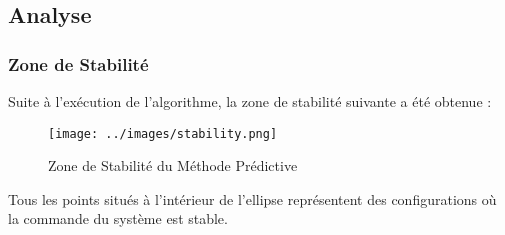 \documentclass[../CSC_5RO16_TA_TP4.tex]{subfiles}
\begin{document}
\begin{scriptsize}\mycode
    
\end{scriptsize}

\newpage\subsection{Analyse}

\subsubsection{Zone de Stabilité}
\noindent Suite à l’exécution de l’algorithme, la zone de stabilité suivante a été obtenue :
\begin{figure}[H]
	\centering
	\texttt{[image: ../images/stability.png]}
	\caption{Zone de Stabilité du Méthode Prédictive}
	\label{fig:methode_predictive_stability}
\end{figure}
\noindent Tous les points situés à l’intérieur de l’ellipse représentent des configurations où la commande du système est stable.
\end{document}

